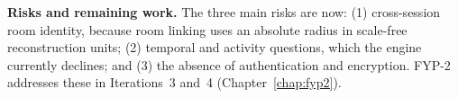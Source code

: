 \textbf{Risks and remaining work.} The three main risks are now: (1)
cross-session room identity, because room linking uses an absolute radius in
scale-free reconstruction units; (2) temporal and activity questions, which the
engine currently declines; and (3) the absence of authentication and
encryption. FYP-2 addresses these in Iterations~3 and~4
(Chapter~\ref{chap:fyp2}).
